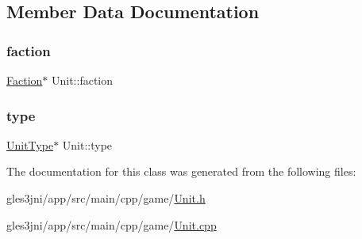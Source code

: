 \subsection{Member Data Documentation}
\mbox{\label{class_unit_a4575f419a61dcd2c4d44754fe99ff3a4}} 
\subsubsection{\texorpdfstring{faction}{faction}}
{\footnotesize\ttfamily \hyperlink{class_faction}{Faction}$\ast$ Unit\+::faction\hspace{0.3cm}{\ttfamily [private]}}

\mbox{\label{class_unit_ab0f889c1dcbe02864fad1fa6af62aa37}} 
\subsubsection{\texorpdfstring{type}{type}}
{\footnotesize\ttfamily \hyperlink{class_unit_type}{Unit\+Type}$\ast$ Unit\+::type\hspace{0.3cm}{\ttfamily [private]}}



The documentation for this class was generated from the following files\+:\begin{DoxyCompactItemize}
\item 
gles3jni/app/src/main/cpp/game/\hyperlink{_unit_8h}{Unit.\+h}\item 
gles3jni/app/src/main/cpp/game/\hyperlink{_unit_8cpp}{Unit.\+cpp}\end{DoxyCompactItemize}
